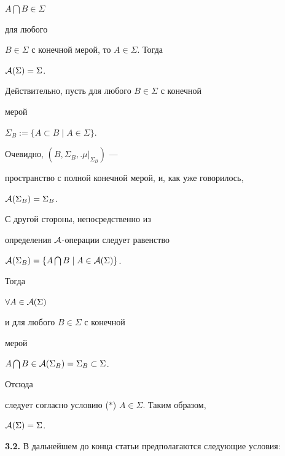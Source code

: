$A\bigcap B\in\Sigma$


для любого


$B\in\Sigma$ с конечной мерой, то $A\in\Sigma$. Тогда


${\cal A}(\Sigma)=\Sigma$.


Действительно, пусть для любого $B\in\Sigma$ с конечной


мерой


$\Sigma_B := \{A\subset B\mid A\in\Sigma\}$.


Очевидно, $(B,\Sigma _B,\bigl.\mu\bigr|_{\Sigma _B})$ ---


пространство с полной конечной мерой, и, как уже говорилось,


${\cal A}(\Sigma_B)=\Sigma_B$.


С другой стороны, непосредственно из


определения ${\cal A}$-операции следует равенство


${\cal A}(\Sigma _B)=\{A\bigcap B\mid A\in {\cal A}(\Sigma)\}$.


Тогда


$\forall A\in{\cal A}(\Sigma)$


и для любого $B\in\Sigma$ с конечной


мерой


$A\bigcap B\in {\cal A}(\Sigma_B)=\Sigma_B\subset\Sigma$.


Отсюда


следует согласно условию ($\ast$) $A\in\Sigma$. Таким образом,


${\cal A}(\Sigma)=\Sigma$.





{\bf 3.2.} В дальнейшем до конца статьи предполагаются следующие условия:


